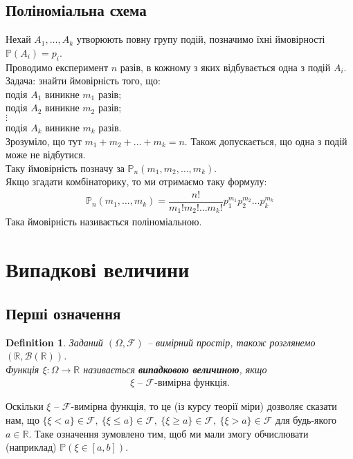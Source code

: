 \documentclass[a4paper, 10pt]{article}
\theoremstyle{theoremdd}
\newtheorem{definition}[theorem]{Definition}
\begin{document}
\subsection{Поліноміальна схема}
Нехай $A_1,\dots,A_k$ утворюють повну групу подій, позначимо їхні ймовірності $\mathbb{P}(A_i) = p_i$.\\
Проводимо експеримент $n$ разів, в кожному з яких відбувається одна з подій $A_i$. Задача: знайти ймовірність того, що:\\
подія $A_1$ виникне $m_1$ разів;\\
подія $A_2$ виникне $m_2$ разів;\\
$\vdots$\\
подія $A_k$ виникне $m_k$ разів.\\
Зрозуміло, що тут $m_1 + m_2 + \dots + m_k = n$. Також допускається, що одна з подій може не відбутися.\\
Таку ймовірність позначу за $\mathbb{P}_n(m_1,m_2,\dots,m_k)$.\\
Якщо згадати комбінаторику, то ми отримаємо таку формулу:
\begin{align*}
\mathbb{P}_n(m_1,\dots,m_k) = \dfrac{n!}{m_1! m_2! \dots m_k!} p_1^{m_1} p_2^{m_2} \dots p_k^{m_k}
\end{align*}
Така ймовірність називається поліноміальною.
\newpage

\section{Випадкові величини}
\subsection{Перші означення}
\begin{definition}
Заданий $(\Omega,\mathcal{F})$ -- вимірний простір, також розглянемо $(\mathbb{R}, \mathcal{B}(\mathbb{R}))$.\\
Функція $\xi \colon \Omega \to \mathbb{R}$ називається \textbf{випадковою величиною}, якщо
\begin{align*}
\xi \text{ -- $\mathcal{F}$-вимірна функція.}
\end{align*}
\end{definition}
\noindent
Оскільки $\xi$ -- $\mathcal{F}$-вимірна функція, то це (із курсу теорії міри) дозволяє сказати нам, що $\{\xi < a\} \in \mathcal{F},\ \{\xi \leq a \} \in \mathcal{F},\ \{\xi \geq a\} \in \mathcal{F},\ \{\xi > a \} \in \mathcal{F}$ для будь-якого $a \in \mathbb{R}$. Таке означення зумовлено тим, щоб ми мали змогу обчислювати (наприклад) $\mathbb{P}(\xi \in [a,b])$.
\end{document}
